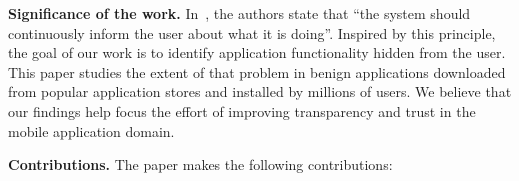 %

\noindent 
{\bf Significance of the work.}  
In~\cite{Nielsen:Molich:CHI90,Blackmon:Polson:Kitajima:Lewis:CHI02,Ko:Zhang:CHI11}, the authors state that  
``the system should continuously inform the user about what it is doing''.
Inspired by this principle, the goal of our work is to identify 
application functionality hidden from the user.
This paper studies the extent of that problem in benign
applications downloaded from popular application stores
and installed by millions of users.
We believe that our findings help focus the effort of improving
transparency and trust in the mobile application domain. 



\noindent 
{\bf Contributions.}
The paper makes the following contributions:

